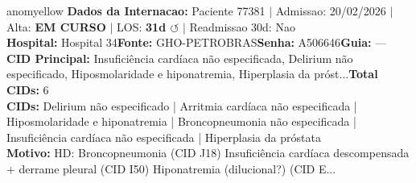 \documentclass[a4paper,10pt]{article}
\begin{document}
\begin{anomalycard}[Internacao 166280 | GHO-PETROBRAS | MODERADO (z=2.05)]{anomyellow}
\textbf{Dados da Internacao:} Paciente 77381 $\mid$ Admissao: 20/02/2026 $\mid$ Alta: \textcolor{anomorange}{\textbf{EM CURSO}} $\mid$ LOS: \textbf{31d \textcolor{anomorange}{$\circlearrowleft$}} $\mid$ Readmissao 30d: Nao\\
\textbf{Hospital:} Hospital 34\quad\textbf{Fonte:} GHO-PETROBRAS\quad\textbf{Senha:} A506646\quad\textbf{Guia:} ---\\
\textbf{CID Principal:} {\small Insuficiência cardíaca não especificada, Delirium não especificado, Hiposmolaridade e hiponatremia, Hiperplasia da próst...}\quad\textbf{Total CIDs:} 6\\

\textbf{CIDs:} {\scriptsize Delirium não especificado | Arritmia cardíaca não especificada | Hiposmolaridade e hiponatremia | Broncopneumonia não especificada | Insuficiência cardíaca não especificada | Hiperplasia da próstata}\\

\textbf{Motivo:} {\scriptsize HD: Broncopneumonia (CID J18) Insuficiência cardíaca descompensada + derrame pleural (CID I50) Hiponatremia (dilucional?) (CID E...}\\


\end{anomalycard}
\end{document}
